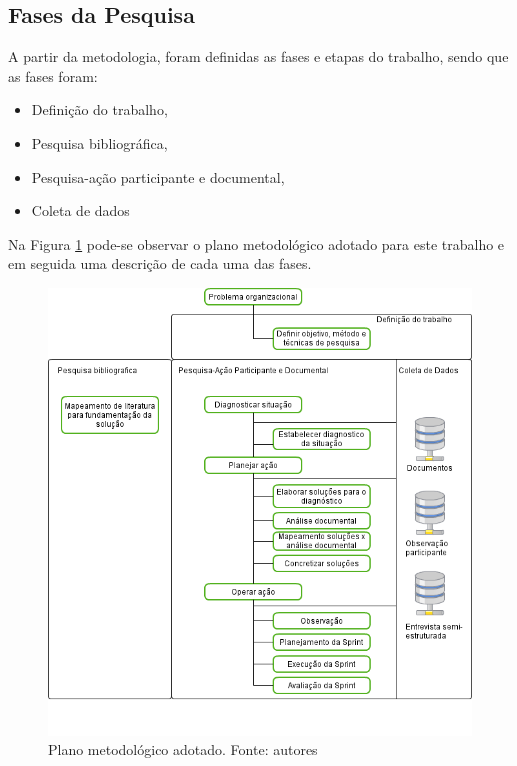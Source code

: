 \subsection{Fases da Pesquisa}

A partir da metodologia, foram definidas as fases e etapas do trabalho, sendo que as fases foram:

\begin{itemize}
	\item Definição do trabalho,
	\item Pesquisa bibliográfica,
	\item Pesquisa-ação participante e documental,
	\item Coleta de dados
\end{itemize}

Na Figura \ref{plano_metodologico} pode-se observar o plano metodológico adotado para este trabalho e em seguida
uma descrição de cada uma das fases.

\begin{figure}[!htb]
	\centering
	\includegraphics[scale=0.6]{figuras/Plano_metodologico}
	\caption{Plano metodológico adotado. Fonte: autores}
	\label{plano_metodologico}
\end{figure}

\newpage

